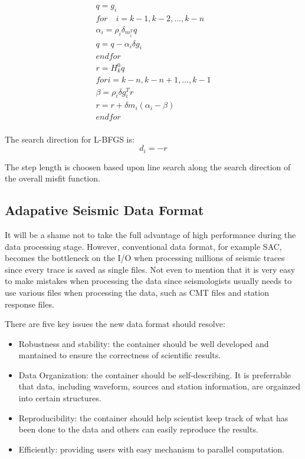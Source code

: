 \documentclass[extra,mreferee]{gji}
\begin{document}
\begin{align*}
q = g_i \\
for \quad i = k -1, k-2, ..., k-n \\
\alpha_i = \rho_i \delta_m_i^{T}q \\
q = q - \alpha_i \delta g_i \\
end for\\
r = H_k^{0}q \\
for i = k-n, k-n+1, ..., k-1 \\
\beta = \rho_i \delta g_i^{T}r \\
    r = r + \delta m_i(\alpha_i - \beta) \\
end for \\
\end{align*}

The search direction for L-BFGS is:
$$d_i = -r$$

The step length is choosen based upon line search along the search direction of the overall misfit function. 

\subsection{Adapative Seismic Data Format}

It will be a shame not to take the full advantage of high performance during the data processing stage. However, conventional data format, for example SAC, becomes the bottleneck on the I/O when processing millions of seismic traces since every trace is saved as single files. Not even to mention that it is very easy to make mistakes when processing the data since seismologists usually needs to use various files when processing the data, such as CMT files and station response files.

There are five key issues the new data format should resolve:
\begin{itemize}
    \item Robustness and stability: the container should be well developed and mantained to ensure the correctness of scientific results.
    \item Data Organization: the container should be self-describing. It is preferrable that data, including waveform, sources and station information, are orgainzed into certain structures.
    \item Reproducibility: the container should help scientist keep track of what has been done to the data and others can easily reproduce the results.
    \item Efficiently: providing users with easy mechanism to parallel computation.
    
\end{itemize}
\end{document}
